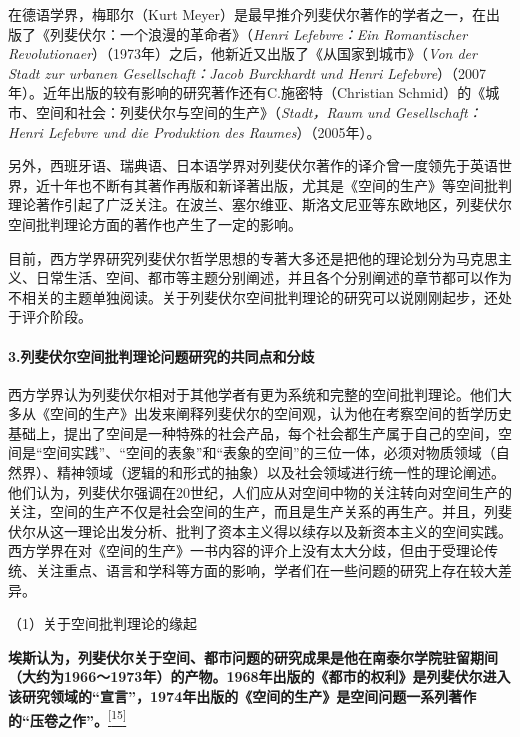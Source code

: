 \documentclass[UTF8, fontset = sourcesans, a4paper, oneside, zihao =
-4, scheme=chinese, no-math, space=true]{ctexbook}
\begin{document}
在德语学界，梅耶尔（Kurt
Meyer）是最早推介列斐伏尔著作的学者之一，在出版了《列斐伏尔：一个浪漫的革命者》（\emph{Henri
Lefebvre：Ein Romantischer
Revolutionaer}）（1973年）之后，他新近又出版了《从国家到城市》（\emph{Von
der Stadt zur urbanen Gesellschaft：Jacob Burckhardt und Henri
Lefebvre}）（2007年）。近年出版的较有影响的研究著作还有C.施密特（Christian
Schmid）的《城市、空间和社会：列斐伏尔与空间的生产》（\emph{Stadt，Raum
und Gesellschaft：Henri Lefebvre und die Produktion des
Raumes}）（2005年）。

另外，西班牙语、瑞典语、日本语学界对列斐伏尔著作的译介曾一度领先于英语世界，近十年也不断有其著作再版和新译著出版，尤其是《空间的生产》等空间批判理论著作引起了广泛关注。在波兰、塞尔维亚、斯洛文尼亚等东欧地区，列斐伏尔空间批判理论方面的著作也产生了一定的影响。

目前，西方学界研究列斐伏尔哲学思想的专著大多还是把他的理论划分为马克思主义、日常生活、空间、都市等主题分别阐述，并且各个分别阐述的章节都可以作为不相关的主题单独阅读。关于列斐伏尔空间批判理论的研究可以说刚刚起步，还处于评介阶段。

\paragraph{3.列斐伏尔空间批判理论问题研究的共同点和分歧}\label{part0004.htmlux5cux23e005}

西方学界认为列斐伏尔相对于其他学者有更为系统和完整的空间批判理论。他们大多从《空间的生产》出发来阐释列斐伏尔的空间观，认为他在考察空间的哲学历史基础上，提出了空间是一种特殊的社会产品，每个社会都生产属于自己的空间，空间是``空间实践''、``空间的表象''和``表象的空间''的三位一体，必须对物质领域（自然界）、精神领域（逻辑的和形式的抽象）以及社会领域进行统一性的理论阐述。他们认为，列斐伏尔强调在20世纪，人们应从对空间中物的关注转向对空间生产的关注，空间的生产不仅是社会空间的生产，而且是生产关系的再生产。并且，列斐伏尔从这一理论出发分析、批判了资本主义得以续存以及新资本主义的空间实践。西方学界在对《空间的生产》一书内容的评介上没有太大分歧，但由于受理论传统、关注重点、语言和学科等方面的影响，学者们在一些问题的研究上存在较大差异。

（1）关于空间批判理论的缘起

\textbf{埃斯认为，列斐伏尔关于空间、都市问题的研究成果是他在南泰尔学院驻留期间（大约为1966～1973年）的产物。1968年出版的《都市的权利》是列斐伏尔进入该研究领域的``宣言''，1974年出版的《空间的生产》是空间问题一系列著作的``压卷之作''。}\protect\hypertarget{part0004.htmlux5cux23w15}{}{}\protect\hyperlink{part0004.htmlux5cux23m15}{\textsuperscript{{[}15{]}}}
\end{document}
